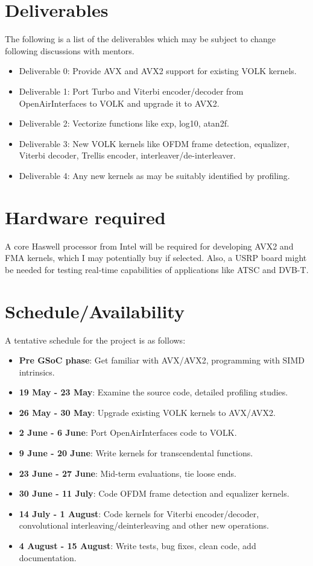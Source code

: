\documentclass[a4paper,12pt,oneside]{article}
\begin{document}
\section{Deliverables}
The following is a list of the deliverables which may be subject to change following discussions with mentors. 

\begin{itemize}
\item Deliverable 0: Provide AVX and AVX2 support for existing VOLK kernels.
\item Deliverable 1: Port Turbo and Viterbi encoder/decoder from OpenAirInterfaces to VOLK and upgrade it to AVX2.
\item Deliverable 2: Vectorize functions like exp, log10, atan2f.
\item Deliverable 3: New VOLK kernels like OFDM frame detection, equalizer, Viterbi decoder, Trellis encoder, interleaver/de-interleaver.
\item Deliverable 4: Any new kernels as may be suitably identified by profiling.
\end{itemize}

\section{Hardware required}

A core Haswell processor from Intel will be required for developing AVX2 and FMA kernels, which I may potentially buy if selected. Also, a USRP board might be needed for testing real-time capabilities of applications like ATSC and DVB-T. 

\section{Schedule/Availability}
A tentative schedule for the project is as follows: 
\begin{itemize}
\item \textbf{Pre GSoC phase}: Get familiar with AVX/AVX2, programming with SIMD intrinsics.   
\item \textbf{19 May - 23 May}: Examine the source code, detailed profiling studies.
\item \textbf{26 May - 30 May}: Upgrade existing VOLK kernels to AVX/AVX2.
\item \textbf{2 June - 6 June}: Port OpenAirInterfaces code to VOLK.
\item \textbf{9 June - 20 June}: Write kernels for transcendental functions.
\item \textbf{23 June - 27 June}: Mid-term evaluations, tie loose ends.
\item \textbf{30 June - 11 July}: Code OFDM frame detection and equalizer kernels.
\item \textbf{14 July - 1 August}: Code kernels for Viterbi encoder/decoder, convolutional interleaving/deinterleaving and other new operations.
\item \textbf{4 August - 15 August}: Write tests, bug fixes, clean code, add documentation.
\end{itemize}
\end{document}
